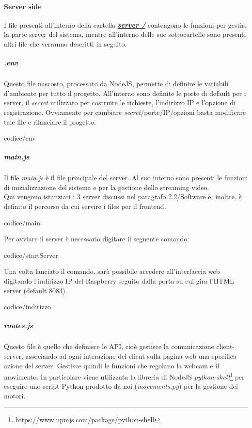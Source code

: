 \documentclass[11pt]{article}
\begin{document}
\paragraph{Server side}
I file presenti all'interno della cartella \underline{\textbf{\textit{server /}}} contengono le funzioni per gestire la parte server del sistema, mentre all'interno delle sue sottocartelle sono presenti altri file che verranno descritti in seguito.\\
\subparagraph{.env}
Questo file nascosto, processato da NodeJS, permette di definire le variabili d'ambiente per tutto il progetto. All'interno sono definite le porte di default per i server, il \textit{secret} utilizzato per costruire le richieste, l'indirizzo IP e l'opzione di registrazione. Ovviamente per cambiare \textit{secret}/porte/IP/opzioni basta modificare tale file e rilanciare il progetto.
\begin{lstinputlisting}
	[caption={File .env},basicstyle=\tiny]{codice/env}
\end{lstinputlisting}
\subparagraph{main.js}
Il file \textit{main.js} è il file principale del server. Al suo interno sono presenti le funzioni di inizializzazione del sistema e per la gestione dello streaming video.\\
Qui vengono istanziati i 3 server discussi nel paragrafo 2.2/Software e, inoltre, è definito il percorso da cui servire i files per il frontend.\\
\begin{lstinputlisting}
	[caption={main.js},basicstyle=\tiny]{codice/main}
\end{lstinputlisting}
Per avviare il server è necessario digitare il seguente comando:
\begin{lstinputlisting}
	[caption={Avvio server},basicstyle=\tiny]{codice/startServer}
\end{lstinputlisting}
Una volta lanciato il comando, sarà possibile accedere all'interfaccia web digitando l'indirizzo IP del Raspberry seguito dalla porta su cui gira l'HTML server (default 8083).
\begin{lstinputlisting}[caption={Esempio indirizzo server},basicstyle=\tiny]{codice/indirizzo}
\end{lstinputlisting}
\subparagraph{routes.js}
Questo file è quello che definisce le API, cioè gestisce la comunicazione client-server, associando ad ogni interazione del client sulla pagina web una specifica azione del server. Gestisce quindi le funzioni che regolano la webcam e il movimento. In particolare viene utilizzata la libreria di NodeJS \textit{python-shell}\footnote{https://www.npmjs.com/package/python-shell} per eseguire uno script Python prodotto da noi (\textit{movements.py}) per la gestione dei motori.
\end{document}
